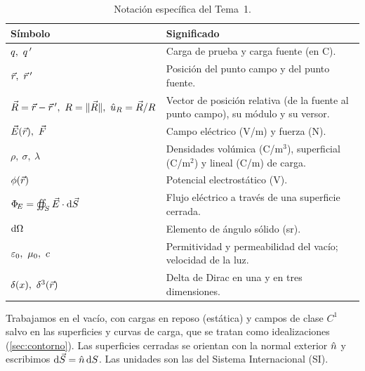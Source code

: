 \begin{table}[ht]
\centering
\caption{Notación específica del Tema~1.}
\label{tab:notacion1}
\small
\renewcommand{\arraystretch}{1.35}
\begin{tabular}{@{}p{4.4cm}p{9.4cm}@{}}
\toprule
Símbolo & Significado\\
\midrule
$q,\ \qp$ & Carga de prueba y carga fuente (en C).\\
$\vc{r},\ \vc{r}\,'$ & Posición del punto campo y del punto fuente.\\
$\vc{R}=\vc{r}-\vc{r}\,',\ R=\norm{\vc{R}},\ \uR=\vc{R}/R$ &
  Vector de posición relativa (de la fuente al punto campo), su módulo y su versor.\\
$\vE(\vc{r}),\ \vF$ & Campo eléctrico (V/m) y fuerza (N).\\
$\rho,\ \sigma,\ \lambda$ & Densidades volúmica (C/m$^{3}$), superficial (C/m$^{2}$) y lineal (C/m) de carga.\\
$\phi(\vec{r})$ & Potencial electrostático (V).\\
$\Phi_{\!E}=\oiint_{S}\vec{E}\cdot\mathrm{d}\vec{S}$ & Flujo eléctrico a través de una superficie cerrada.\\
$\mathrm{d}\Omega$ & Elemento de ángulo sólido (sr).\\
$\eo,\ \mu_{0},\ c$ & Permitividad y permeabilidad del vacío; velocidad de la luz.\\
$\delta(x),\ \delta^{3}(\vc{r})$ & Delta de Dirac en una y en tres dimensiones.\\
\bottomrule
\end{tabular}
\end{table}

\begin{notacion}\label{not:convenios1}
Trabajamos en el vacío, con cargas en reposo (estática) y campos de clase $C^{1}$ salvo en
las superficies y curvas de carga, que se tratan como idealizaciones (\cref{sec:contorno}). Las
superficies cerradas se orientan con la normal exterior $\hat{n}$ y escribimos $\mathrm{d}\vec{S}=\hat{n}\,\mathrm{d} S$.
Las unidades son las del Sistema Internacional (SI).
\end{notacion}
